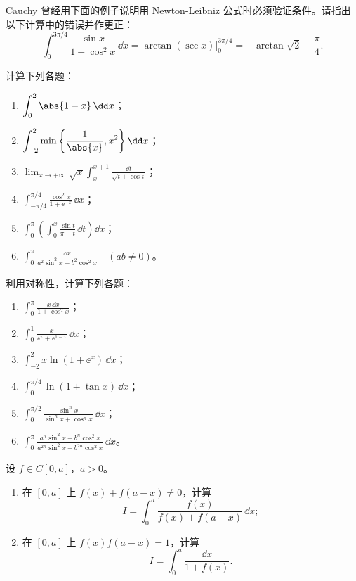 \begin{xexercise}[1]
Cauchy 曾经用下面的例子说明用 Newton-Leibniz 公式时必须验证条件。请指出以下计算中的错误并作更正：
\[
  \int_0^{3\pi/4}\frac{\sin x}{1+\cos^2x}\,\dd x
  =\arctan(\sec x)\Big|_0^{3\pi/4}
  =-\arctan\sqrt2-\frac\pi4.
\]
\end{xexercise}

\begin{xexercise}[2]
计算下列各题：
\begin{enumerate}[label=(\arabic*)]
  \item $\displaystyle\int_0^2\abs{1-x}\,\dd x$；
  \item $\displaystyle\int_{-2}^2\min\left\{\frac1{\abs{x}},x^2\right\}\dd x$；
  \item $\displaystyle\lim_{x\to+\infty}\sqrt{x}\int_x^{x+1}\frac{\dd t}{\sqrt{t+\cos t}}$；
  \item $\displaystyle\int_{-\pi/4}^{\pi/4}\frac{\cos^2x}{1+\ee^{-x}}\,\dd x$；
  \item $\displaystyle\int_0^\pi\left(\int_0^x\frac{\sin t}{\pi-t}\,\dd t\right)\dd x$；
  \item $\displaystyle\int_0^\pi\frac{\dd x}{a^2\sin^2x+b^2\cos^2x}\quad(ab\ne0)$。
\end{enumerate}
\end{xexercise}

\begin{xexercise}[3]
利用对称性，计算下列各题：
\begin{enumerate}[label=(\arabic*)]
  \item $\displaystyle\int_0^\pi\frac{x\,\dd x}{1+\cos^2x}$；
  \item $\displaystyle\int_0^1\frac{x}{\ee^x+\ee^{1-x}}\,\dd x$；
  \item $\displaystyle\int_{-2}^2x\ln(1+\ee^x)\,\dd x$；
  \item $\displaystyle\int_0^{\pi/4}\ln(1+\tan x)\,\dd x$；
  \item $\displaystyle\int_0^{\pi/2}\frac{\sin^n x}{\sin^n x+\cos^n x}\,\dd x$；
  \item $\displaystyle\int_0^\pi\frac{a^n\sin^2x+b^n\cos^2x}{a^{2n}\sin^2x+b^{2n}\cos^2x}\,\dd x$。
\end{enumerate}
\end{xexercise}

\begin{xexercise}[4]
设 $f\in C[0,a]$，$a>0$。
\begin{enumerate}[label=(\arabic*)]
  \item 在 $[0,a]$ 上 $f(x)+f(a-x)\ne0$，计算
  \[
    I=\int_0^a\frac{f(x)}{f(x)+f(a-x)}\,\dd x;
  \]
  \item 在 $[0,a]$ 上 $f(x)f(a-x)=1$，计算
  \[
    I=\int_0^a\frac{\dd x}{1+f(x)}.
  \]
\end{enumerate}
\end{xexercise}

